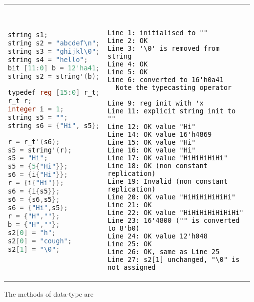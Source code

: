 \begin{table}
\begin{tabular}{p{} p{}}
\begin{lstlisting}[language=Verilog, label=dt!literal!struct, caption=Structure Literals]
string s1;
string s2 = "abcdef\n";
string s3 = "ghijkl\0";
string s4 = "hello";
bit [11:0] b = 12'ha41;
string s2 = string'(b);

typedef reg [15:0] r_t;
r_t r;
integer i = 1;
string s5 = "";
string s6 = {"Hi", s5};

r = r_t'(s6);
s5 = string'(r);
s5 = "Hi";
s5 = {5{"Hi"}};
s6 = {i{"Hi"}};
r = {i{"Hi"}};
s6 = {i{s5}};
s6 = {s6,s5};
s6 = {"Hi",s5};
r = {"H",""};
b = {"H",""};
s2[0] = "h";
s2[0] = "cough";
s2[1] = "\0";
\end{lstlisting}
&
\begin{tbldesc}
\begin{verbatim}


Line 1: initialised to ""
Line 2: OK
Line 3: '\0' is removed from string
Line 4: OK
Line 5: OK
Line 6: converted to 16'h0a41
  Note the typecasting operator

Line 9: reg init with 'x
Line 11: explicit string init to ""
Line 12: OK value "Hi"
Line 14: OK value 16'h4869
Line 15: OK value "Hi"
Line 16: OK value "Hi"
Line 17: OK value "HiHiHiHiHi"
Line 18: OK (non constant replication)
Line 19: Invalid (non constant replication)
Line 20: OK value "HiHiHiHiHiHi"
Line 21: OK
Line 22: OK value "HiHiHiHiHiHiHi"
Line 23: 16'4800 ("" is converted to 8'b0)
Line 24: OK value 12'h048
Line 25: OK
Line 26: OK, same as Line 25
Line 27: s2[1] unchanged, "\0" is not assigned
\end{verbatim}
\end{tbldesc}
\end{tabular}
\end{table}

The methods of \kwstring data-type are

